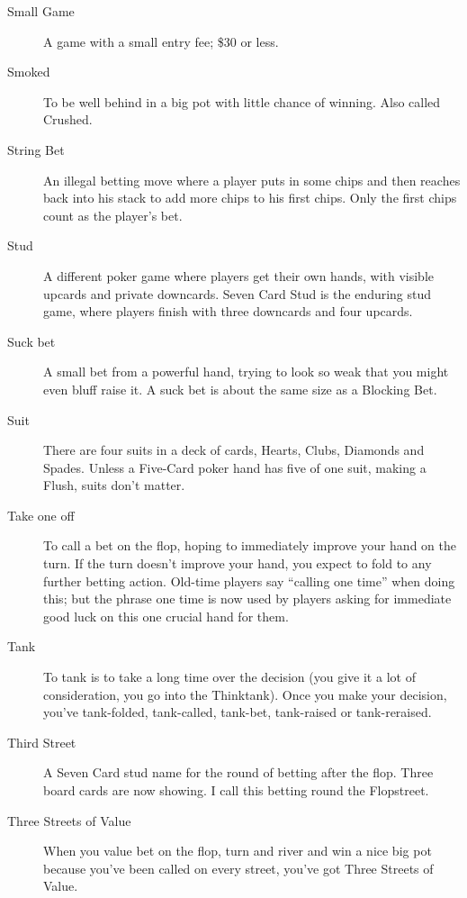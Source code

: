 \begin{description}
\item[Small Game] A game with a small entry fee; \$30 or less.

\item[Smoked] To be well behind in a big pot with little chance of
winning. Also called Crushed.

\item[String Bet] An illegal betting move where a player puts in some
chips and then reaches back into his stack to add more chips to his
first chips. Only the first chips count as the player's bet.

\item[Stud] A different poker game where players get their own hands,
with visible upcards and private downcards. Seven Card Stud is the
enduring stud game, where players finish with three downcards and four
upcards.

\item[Suck bet] A small bet from a powerful hand, trying to look so
weak that you might even bluff raise it. A suck bet is about the same
size as a Blocking Bet.

\item[Suit] There are four suits in a deck of cards, Hearts, Clubs,
Diamonds and Spades. Unless a Five-Card poker hand has five of one
suit, making a Flush, suits don't matter.

\item[Take one off] To call a bet on the flop, hoping to immediately
improve your hand on the turn. If the turn doesn't improve your hand,
you expect to fold to any further betting action. Old-time players say
``calling one time'' when doing this; but the phrase one time is now
used by players asking for immediate good luck on this one crucial
hand for them.

\item[Tank] To tank is to take a long time over the decision
(you give it a lot of consideration, you go into the Thinktank).
Once you make your decision, you've tank-folded, tank-called, tank-bet,
tank-raised or tank-reraised.

\item[Third Street] A Seven Card stud name for the round of betting
after the flop. Three board cards are now showing. I call this betting
round the Flopstreet.

\item[Three Streets of Value] When you value bet on the flop, turn
and river and win a nice big pot because you've been called on every
street, you've got Three Streets of Value.


\end{description}
